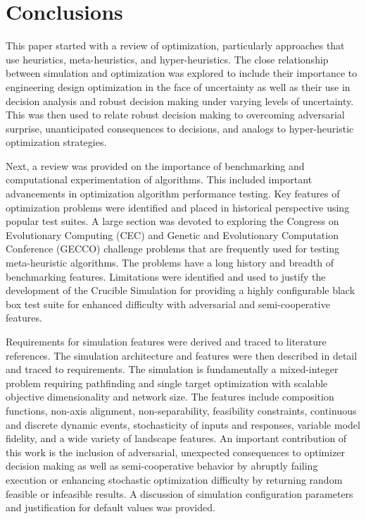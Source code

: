 \documentclass[a4paper]{article}
\begin{document}



\section{Conclusions}

This paper started with a review of optimization, particularly approaches that use heuristics, meta-heuristics, and hyper-heuristics. The close relationship between simulation and optimization was explored to include their importance to engineering design optimization in the face of uncertainty as well as their use in decision analysis and robust decision making under varying levels of uncertainty. This was then used to relate robust decision making to overcoming adversarial surprise, unanticipated consequences to decisions, and analogs to hyper-heuristic optimization strategies.

Next, a review was provided on the importance of benchmarking and computational experimentation of algorithms. This included important advancements in optimization algorithm performance testing. Key features of optimization problems were identified and placed in historical perspective using popular test suites. A large section was devoted to exploring the Congress on Evolutionary Computing (CEC) and Genetic and Evolutionary Computation Conference (GECCO) challenge problems that are frequently used for testing meta-heuristic algorithms. The problems have a long history and breadth of benchmarking features. Limitations were identified and used to justify the development of the Crucible Simulation for providing a highly configurable black box test suite for enhanced difficulty with adversarial and semi-cooperative features.

Requirements for simulation features were derived and traced to literature references. The simulation architecture and features were then described in detail and traced to requirements. The simulation is fundamentally a mixed-integer problem requiring pathfinding and single target optimization with scalable objective dimensionality and network size. The features include composition functions, non-axis alignment, non-separability, feasibility constraints, continuous and discrete dynamic events, stochasticity of inputs and responses, variable model fidelity, and a wide variety of landscape features. An important contribution of this work is the inclusion of adversarial, unexpected consequences to optimizer decision making as well as semi-cooperative behavior by abruptly failing execution or enhancing stochastic optimization difficulty by returning random feasible or infeasible results. A discussion of simulation configuration parameters and justification for default values was provided.
\end{document}
